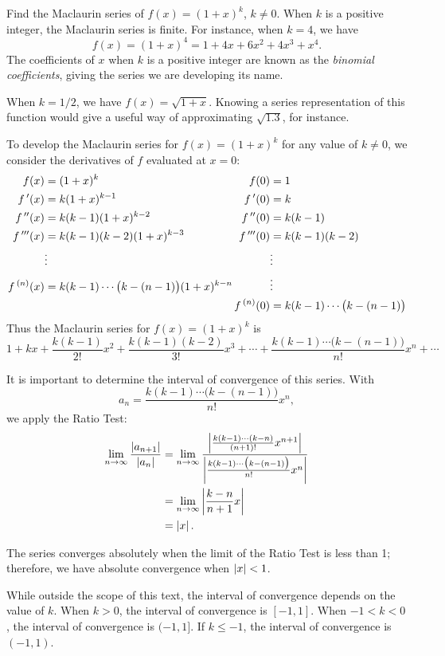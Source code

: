 \begin{example}\label{ex_ts4}%
Find the Maclaurin series of $f(x) = (1+x)^k$, $k\neq 0$.
\solution
When $k$ is a positive integer, the Maclaurin series is finite. For instance, when $k=4$, we have 
\[f(x) = (1+x)^4 = 1+4x+6x^2+4x^3+x^4.\]
The coefficients of $x$ when $k$ is a positive integer are known as the \emph{binomial coefficients}, giving the series we are developing its name.

When $k=1/2$, we have $f(x) = \sqrt{1+x}$. Knowing a series representation of this function would give a useful way of approximating $\sqrt{1.3}$, for instance.

To develop the Maclaurin series for $f(x) = (1+x)^k$ for any value of $k\neq0$, we consider the derivatives of $f$ evaluated at $x=0$:
{%
\small%
\begin{align*}
f(x) &= (1+x)^k & f(0) &= 1\\
\fp(x) &= k(1+x)^{k-1} & \fp(0) &=k\\
\fp'(x) &= k(k-1)(1+x)^{k-2} & \fp'(0) &=k(k-1)\\
\fp''(x) &= k(k-1)(k-2)(1+x)^{k-3} & \fp''(0) &=k(k-1)(k-2)\\
&\vdots & &\vdots\\
f\,^{(n)}(x) &= k(k-1)\dotsm\bigl(k-(n-1)\bigr)(1+x)^{k-n}
\mkern-3\thickmuskip&&\vdots \\
&& f\,^{(n)}(0) &=k(k-1)\dotsm\bigl(k-(n-1)\bigr)
\end{align*}}%
Thus the Maclaurin series for $f(x) = (1+x)^k$ is
\[
1+ kx + \frac{k(k-1)}{2!}x^2 + \frac{k(k-1)(k-2)}{3!}x^3 + \dotsb + \frac{k(k-1)\dotsm\bigl(k-(n-1)\bigr)}{n!}x^n+\dotsb
\]

It is important to determine the interval of convergence of this series. With 
\[a_n = \frac{k(k-1)\dotsm\bigl(k-(n-1)\bigr)}{n!}x^n,\]
we apply the Ratio Test:
\begin{align*}
	\lim_{n\to\infty}\frac{\left\lvert a_{n+1} \right\rvert}{\left\lvert a_n \right\rvert}
	&=\lim_{n\to\infty}\frac{\left\lvert \frac{k(k-1)\dotsm(k-n)}{(n+1)!}x^{n+1} \right\rvert}{\left\lvert \frac{k(k-1)\dotsm\bigl(k-(n-1)\bigr)}{n!}x^n \right\rvert}\\
		&=\lim_{n\to\infty} \left\lvert \frac{k-n}{n+1}x \right\rvert\\
		&= \left\lvert x \right\rvert.
\end{align*}

The series converges absolutely when the limit of the Ratio Test is less than 1; therefore, we have absolute convergence when $\left\lvert x \right\rvert<1$. 

While outside the scope of this text, the interval of convergence depends on the value of $k$. When $k>0$, the interval of convergence is $[-1,1]$. When $-1<k<0$, the interval of convergence is $(-1,1]$. If $k\leq -1$, the interval of convergence is $(-1,1)$.
\end{example}

